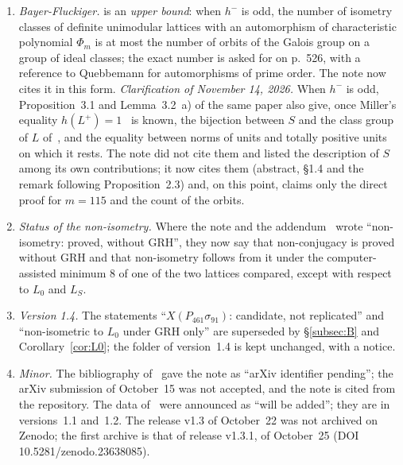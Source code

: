 \documentclass[11pt,a4paper]{amsart}
\theoremstyle{plain}
\theoremstyle{definition}
\newcommand{\Lz}{L_{0}}
\newcommand{\LS}{L_{S}}
\newcommand{\XB}{X(P_{461}\sigma_{91})}
\begin{document}
\begin{enumerate}[label=\textup{(\arabic*)}]
\item \emph{Bayer-Fluckiger.} \cite[Cor.~3.3]{Bay84} is an \emph{upper bound}: when $h^-$ is odd, the number of isometry classes of definite unimodular lattices with an automorphism of characteristic polynomial $\Phi_m$ is at most the number of orbits of the Galois group on a group of ideal classes; the exact number is asked for on p.~526, with a reference to Quebbemann for automorphisms of prime order. The note now cites it in this form. \emph{Clarification of November 14, 2026.} When $h^-$ is odd, Proposition~3.1 and Lemma~3.2~a) of the same paper also give, once Miller's equality $h(L^+)=1$~\cite{Mil14} is known, the bijection between $S$ and the class group of $L$ of~\cite[Prop.~2.3]{Gau26}, and the equality between norms of units and totally positive units on which it rests. The note did not cite them and listed the description of $S$ among its own contributions; it now cites them (abstract, \S1.4 and the remark following Proposition~2.3) and, on this point, claims only the direct proof for $m=115$ and the count of the orbits.
\item \emph{Status of the non-isometry.} Where the note and the addendum~\cite{Gau26a} wrote ``non-isometry: proved, without GRH'', they now say that non-conjugacy is proved without GRH and that non-isometry follows from it under the computer-assisted minimum $8$ of one of the two lattices compared, except with respect to $\Lz$ and $\LS$.
\item \emph{Version 1.4.} The statements ``$\XB$: candidate, not replicated'' and ``non-isometric to $\Lz$ under GRH only'' are superseded by \S\ref{subsec:B} and Corollary~\ref{cor:L0}; the folder of version~1.4 is kept unchanged, with a notice.
\item \emph{Minor.} The bibliography of~\cite{Gau26a} gave the note as ``arXiv identifier pending''; the arXiv submission of October~15 was not accepted, and the note is cited from the repository. The data of~\cite{Gau26a} were announced as ``will be added''; they are in versions~1.1 and~1.2. The release v1.3 of October~22 was not archived on Zenodo; the first archive is that of release v1.3.1, of October~25 (DOI 10.5281/zenodo.23638085).
\end{enumerate}
\end{document}
